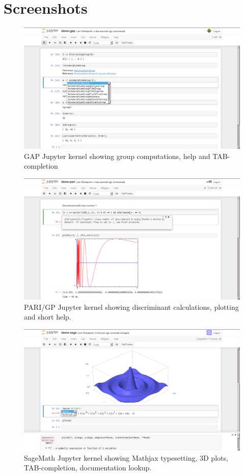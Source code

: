 \documentclass{deliverablereport}
\author{Jeroen Demeyer, Markus Pfeiffer, Nicolas M. Thiéry}
\begin{document}
\maketitle
\githubissuedescription
\tableofcontents
\clearpage
\section{Screenshots}
\begin{figure}[ht]
  \includegraphics[width=140mm,trim={0 0 0 1px},clip]{gap.png}
  \caption{GAP Jupyter kernel showing group computations,
  help and TAB-completion}
\end{figure}
\begin{figure}[ht]
  \includegraphics[width=140mm,trim={0 0 0 1px},clip]{pari.png}
  \caption{PARI/GP Jupyter kernel showing
    discriminant calculations, plotting and short help.}
\end{figure}
\begin{figure}[ht]
  \includegraphics[width=140mm,trim={0 0 0 1px},clip]{sage.png}
  \caption{SageMath Jupyter kernel showing Mathjax
    typesetting, 3D plots, TAB-completion, documentation lookup.}
\end{figure}
\end{document}
